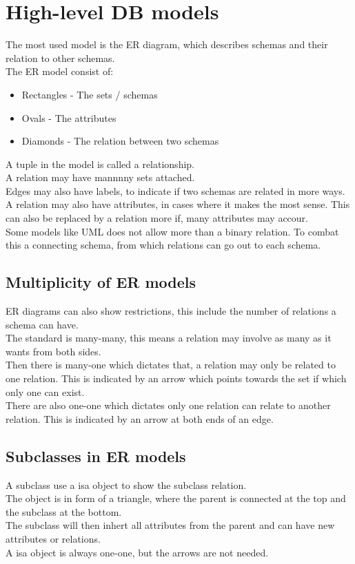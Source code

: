 \documentclass[12pt, a4paper]{article}
\begin{document}
	\section{High-level DB models}
		The most used model is the ER diagram, which describes schemas and their relation to other schemas.\\
		The ER model consist of:
		\begin{itemize}
				  	\item Rectangles - The sets / schemas
					\item Ovals - The attributes 
					\item Diamonds - The relation between two schemas
		\end{itemize}
		A tuple in the model is called a relationship.\\
		A relation may have mannnny sets attached.\\
		Edges may also have labels, to indicate if two schemas are related in more ways.\\
		A relation may also have attributes, in cases where it makes the most sense. This can also be replaced by a relation more if, many attributes may accour.\\
		Some models like UML does not allow more than a binary relation. To combat this a connecting schema, from which relations can go out to each schema.
		\subsection{Multiplicity of ER models}
				  ER diagrams can also show restrictions, this include the number of relations a schema can have.\\
				  The standard is many-many, this means a relation may involve as many as it wants from both sides.\\
				  Then there is many-one which dictates that, a relation may only be related to one relation. This is indicated by an arrow which points towards the set if which only one can exist.\\
				  There are also one-one which dictates only one relation can relate to another relation. This is indicated by an arrow at both ends of an edge.
		\subsection{Subclasses in ER models}
			A subclass use a isa object to show the subclass relation.\\
			The object is in form of a triangle, where the parent is connected at the top and the subclass at the bottom.\\
			The subclass will then inhert all attributes from the parent and can have new attributes or relations.\\
			A isa object is always one-one, but the arrows are not needed.
\end{document}

